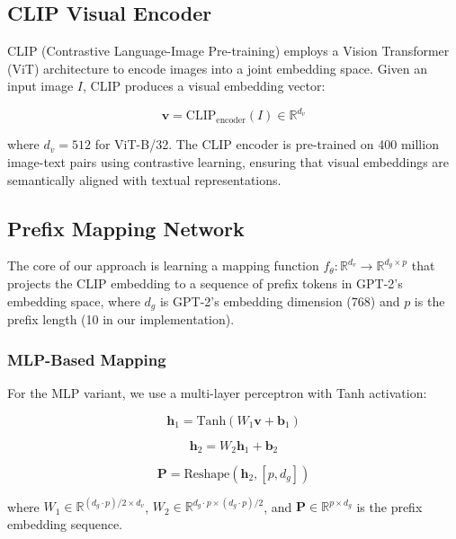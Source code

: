 \documentclass[runningheads]{llncs}
\begin{document}
\subsection{CLIP Visual Encoder}

CLIP (Contrastive Language-Image Pre-training) employs a Vision Transformer (ViT) architecture to encode images into a joint embedding space. Given an input image $I$, CLIP produces a visual embedding vector:

\begin{equation}
\mathbf{v} = \text{CLIP}_{\text{encoder}}(I) \in \mathbb{R}^{d_v}
\end{equation}

where $d_v = 512$ for ViT-B/32. The CLIP encoder is pre-trained on 400 million image-text pairs using contrastive learning, ensuring that visual embeddings are semantically aligned with textual representations.

\subsection{Prefix Mapping Network}

The core of our approach is learning a mapping function $f_\theta: \mathbb{R}^{d_v} \rightarrow \mathbb{R}^{d_g \times p}$ that projects the CLIP embedding to a sequence of prefix tokens in GPT-2's embedding space, where $d_g$ is GPT-2's embedding dimension (768) and $p$ is the prefix length (10 in our implementation).

\subsubsection{MLP-Based Mapping}

For the MLP variant, we use a multi-layer perceptron with Tanh activation:

\begin{equation}
\mathbf{h}_1 = \text{Tanh}(W_1 \mathbf{v} + \mathbf{b}_1)
\end{equation}

\begin{equation}
\mathbf{h}_2 = W_2 \mathbf{h}_1 + \mathbf{b}_2
\end{equation}

\begin{equation}
\mathbf{P} = \text{Reshape}(\mathbf{h}_2, [p, d_g])
\end{equation}

where $W_1 \in \mathbb{R}^{(d_g \cdot p)/2 \times d_v}$, $W_2 \in \mathbb{R}^{d_g \cdot p \times (d_g \cdot p)/2}$, and $\mathbf{P} \in \mathbb{R}^{p \times d_g}$ is the prefix embedding sequence.
\end{document}

